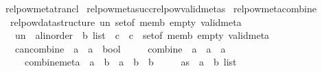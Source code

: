 \begin{isabellebody}
\isanewline
{}\isamarkupfalse%
\ relpow{\isacharunderscore}{\kern0pt}meta{\isacharunderscore}{\kern0pt}trancl\isanewline
\isanewline
{}\isamarkupfalse%
\ relpow{\isacharunderscore}{\kern0pt}meta{\isacharunderscore}{\kern0pt}succ{\isachardot}{\kern0pt}relpow{\isacharunderscore}{\kern0pt}valid{\isacharunderscore}{\kern0pt}metas\isanewline
\isanewline
{}\isamarkupfalse%
%
\isadelimdocument
%
\endisadelimdocument
%
\isatagdocument
%
\isamarkuptrue%
%
\endisatagdocument
{\isafolddocument}%
%
\isadelimdocument
%
\endisadelimdocument
{}\isamarkupfalse%
\ relpow{\isacharunderscore}{\kern0pt}meta{\isacharunderscore}{\kern0pt}combine\ {\isacharequal}{\kern0pt}\isanewline
\ \ relpow{\isacharunderscore}{\kern0pt}data{\isacharunderscore}{\kern0pt}structure\ un\ set{\isacharunderscore}{\kern0pt}of\ memb\ empty\ valid{\isacharunderscore}{\kern0pt}meta\isanewline
\ \ \ un\ {\isacharcolon}{\kern0pt}{\isacharcolon}{\kern0pt}\ {\isachardoublequoteopen}{\isacharparenleft}{\kern0pt}{\isacharparenleft}{\kern0pt}{\isacharprime}{\kern0pt}a{\isacharcolon}{\kern0pt}{\isacharcolon}{\kern0pt}linorder{\isacharparenright}{\kern0pt}\ {\isacharasterisk}{\kern0pt}\ {\isacharprime}{\kern0pt}b{\isacharparenright}{\kern0pt}\ list\ {\isasymRightarrow}\ {\isacharprime}{\kern0pt}c\ {\isasymRightarrow}\ {\isacharprime}{\kern0pt}c{\isachardoublequoteclose}\ \ set{\isacharunderscore}{\kern0pt}of\ memb\ empty\ valid{\isacharunderscore}{\kern0pt}meta\ {\isacharplus}{\kern0pt}\isanewline
\ \ \ can{\isacharunderscore}{\kern0pt}combine\ {\isacharcolon}{\kern0pt}{\isacharcolon}{\kern0pt}\ {\isachardoublequoteopen}{\isacharprime}{\kern0pt}a\ {\isasymRightarrow}\ {\isacharprime}{\kern0pt}a\ {\isasymRightarrow}\ bool{\isachardoublequoteclose}\isanewline
\ \ \ \ \ combine\ {\isacharcolon}{\kern0pt}{\isacharcolon}{\kern0pt}\ {\isachardoublequoteopen}{\isacharprime}{\kern0pt}a\ {\isasymRightarrow}\ {\isacharprime}{\kern0pt}a\ {\isasymRightarrow}\ {\isacharprime}{\kern0pt}a{\isachardoublequoteclose}\isanewline
\ \ \ \ \ combine{\isacharunderscore}{\kern0pt}meta\ {\isacharcolon}{\kern0pt}{\isacharcolon}{\kern0pt}\ {\isachardoublequoteopen}{\isacharprime}{\kern0pt}a\ {\isasymRightarrow}\ {\isacharprime}{\kern0pt}b\ {\isasymRightarrow}\ {\isacharprime}{\kern0pt}a\ {\isasymRightarrow}\ {\isacharprime}{\kern0pt}b\ {\isasymRightarrow}\ {\isacharprime}{\kern0pt}b{\isachardoublequoteclose}\isanewline
\ \ \ \ \ as\ {\isacharcolon}{\kern0pt}{\isacharcolon}{\kern0pt}\ {\isachardoublequoteopen}{\isacharparenleft}{\kern0pt}{\isacharprime}{\kern0pt}a\ {\isasymtimes}\ {\isacharprime}{\kern0pt}b{\isacharparenright}{\kern0pt}\ list{\isachardoublequoteclose}\isanewline

\end{isabellebody}

